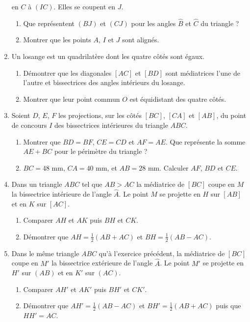 \begin{enumerate}
en $C$ à $(IC)$. Elles se coupent en $J$. \begin{enumerate}
\item Que représentent $(BJ)$ et $(CJ)$ pour les angles $\widehat{B}$ et $\widehat{C}$ du triangle ?
\item Montrer que les points $A$, $I$ et $J$ sont alignés.
\end{enumerate}
\item Un losange est un quadrilatère dont les quatre côtés sont égaux.\begin{enumerate}
\item Démontrer que les diagonales $[AC]$ et $[BD]$ sont médiatrices l'une de l'autre et bissectrices des angles intérieurs du losange. 
\item Montrer que leur point commun $O$ est équidistant des quatre côtés. 
\end{enumerate}
\item Soient $D$, $E$, $F$ les projections, sur les côtés $[BC]$, $[CA]$ et $[AB]$,
du point de concours $I$ des bissectrices intérieures du triangle $ABC$.
\begin{enumerate}
\item Montrer que $BD=BF$, $CE=CD$ et $AF=AE$. Que représente la somme $AE+BC$ pour le périmètre du triangle ? 
\item $BC= 48$ mm, $CA=40$ mm, et $AB=28$ mm. Calculer $AF$, $BD$ et $CE$.
\end{enumerate}
\item Dans un triangle $ABC$ tel que $AB>AC$ la médiatrice de $[BC]$ coupe en $M$
la bissectrice intérieure de l'angle $\widehat{A}$. Le point $M$ se projette en 
$H$ sur $[AB]$ et en $K$ sur $[AC]$. 
\begin{enumerate}
\item Comparer $AH$ et $AK$ puis $BH$ et $CK$. 
\item Démontrer que $AH=\frac12(AB+AC)$ et $BH=\frac12(AB-AC)$.
\end{enumerate}
\item Dans le même triangle $ABC$ qu'à l'exercice précédent, la médiatrice de $[BC]$ 
coupe en $M'$ la bissectrice extérieure de l'angle $\widehat{A}$. Le point $M'$ se projette en $H'$ sur $(AB)$ et en $K'$ sur $(AC)$. \begin{enumerate}
\item Comparer $AH'$ et $AK'$ puis $BH'$ et $CK'$.
\item Démontrer que $AH'=\frac12(AB-AC)$ et $BH'=\frac12(AB+AC)$ puis que $HH'=AC$. 
\end{enumerate}

\end{enumerate}
